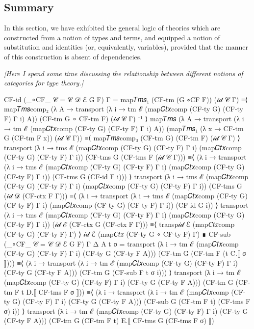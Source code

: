 \subsection{Summary}

In this section, we have exhibited the general logic of theories which are
constructed from a notion of types and terms, and equipped a notion of
substitution and identities (or, equivalently, variables), provided that the
manner of this construction is absent of dependencies.

\noindent
\emph{[Here I spend some time discussing the relationship between different
notions of categories for type theory.]}

\begin{code}[hide]
CF-id (_∘CF_ {𝒞 = 𝒞} {𝒟} {ℰ} G F) {Γ} =
  map𝑇𝑚𝑠₁ (CF-tm (G ∘CF F)) (𝒾𝒹 𝒞 Γ)
    ≡⟨ map𝑇𝑚𝑠comp₂ (λ {A} → transport (λ i → tm ℰ (map𝐶𝑡𝑥comp (CF-ty G) (CF-ty F) Γ i) A))
      (CF-tm G ∘ CF-tm F) (𝒾𝒹 𝒞 Γ) ⁻¹ ⟩
  map𝑇𝑚𝑠 (λ {A} → transport (λ i → tm ℰ (map𝐶𝑡𝑥comp (CF-ty G) (CF-ty F) Γ i) A))
    (map𝑇𝑚𝑠₁ (λ x → CF-tm G (CF-tm F x)) (𝒾𝒹 𝒞 Γ))
    ≡⟨ map𝑇𝑚𝑠comp₃ (CF-tm G) (CF-tm F) (𝒾𝒹 𝒞 Γ) ⟩
  transport (λ i → tms ℰ (map𝐶𝑡𝑥comp (CF-ty G) (CF-ty F) Γ i) (map𝐶𝑡𝑥comp (CF-ty G) (CF-ty F) Γ i))
    (CF-tms G (CF-tms F (𝒾𝒹 𝒞 Γ)))
    ≡⟨ (λ i → transport (λ i → tms ℰ (map𝐶𝑡𝑥comp (CF-ty G) (CF-ty F) Γ i)
      (map𝐶𝑡𝑥comp (CF-ty G) (CF-ty F) Γ i)) (CF-tms G (CF-id F i))) ⟩
  transport (λ i → tms ℰ (map𝐶𝑡𝑥comp (CF-ty G) (CF-ty F) Γ i) (map𝐶𝑡𝑥comp (CF-ty G) (CF-ty F) Γ i))
    (CF-tms G (𝒾𝒹 𝒟 (CF-ctx F Γ)))
    ≡⟨ (λ i → transport (λ i → tms ℰ (map𝐶𝑡𝑥comp (CF-ty G) (CF-ty F) Γ i)
      (map𝐶𝑡𝑥comp (CF-ty G) (CF-ty F) Γ i)) (CF-id G i)) ⟩
  transport (λ i → tms ℰ (map𝐶𝑡𝑥comp (CF-ty G) (CF-ty F) Γ i) (map𝐶𝑡𝑥comp (CF-ty G) (CF-ty F) Γ i))
    (𝒾𝒹 ℰ (CF-ctx G (CF-ctx F Γ)))
    ≡⟨ transp𝒾𝒹 ℰ (map𝐶𝑡𝑥comp (CF-ty G) (CF-ty F) Γ) ⟩
  𝒾𝒹 ℰ (map𝐶𝑡𝑥 (CF-ty G ∘ CF-ty F) Γ)
    ∎
CF-sub (_∘CF_ {𝒞 = 𝒞} {𝒟} {ℰ} G F) {Γ} {Δ} {A} t σ =
  transport (λ i → tm ℰ (map𝐶𝑡𝑥comp (CF-ty G) (CF-ty F) Γ i) (CF-ty G (CF-ty F A)))
    (CF-tm G (CF-tm F (t C.⟦ σ ⟧)))
    ≡⟨ (λ i → transport (λ i → tm ℰ (map𝐶𝑡𝑥comp (CF-ty G) (CF-ty F) Γ i) (CF-ty G (CF-ty F A)))
      (CF-tm G (CF-sub F t σ i))) ⟩
  transport (λ i → tm ℰ (map𝐶𝑡𝑥comp (CF-ty G) (CF-ty F) Γ i) (CF-ty G (CF-ty F A)))
    (CF-tm G (CF-tm F t D.⟦ CF-tms F σ ⟧))
    ≡⟨ (λ i → transport (λ i → tm ℰ (map𝐶𝑡𝑥comp (CF-ty G) (CF-ty F) Γ i) (CF-ty G (CF-ty F A)))
      (CF-sub G (CF-tm F t) (CF-tms F σ) i)) ⟩
  transport (λ i → tm ℰ (map𝐶𝑡𝑥comp (CF-ty G) (CF-ty F) Γ i) (CF-ty G (CF-ty F A)))
    (CF-tm G (CF-tm F t) E.⟦ CF-tms G (CF-tms F σ) ⟧)

\end{code}
